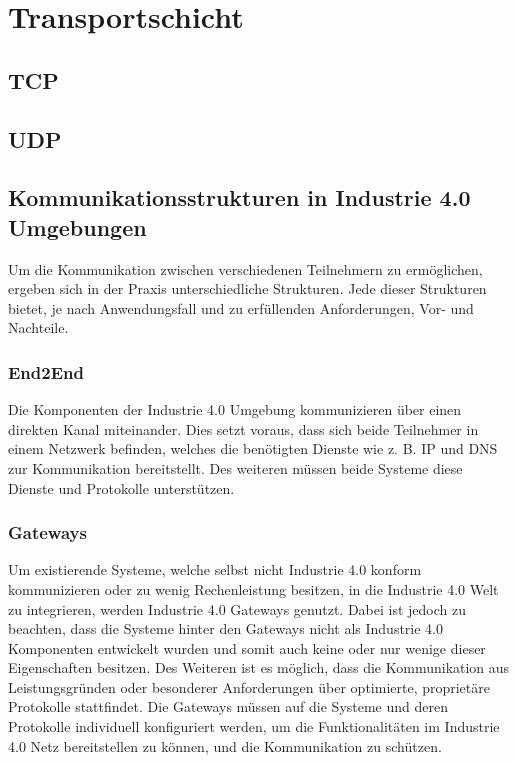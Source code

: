 \section{Transportschicht}
\subsection{TCP}
\subsection{UDP}

\subsection{Kommunikationsstrukturen in Industrie 4.0 Umgebungen}
Um die Kommunikation zwischen verschiedenen Teilnehmern zu ermöglichen, ergeben sich in der Praxis unterschiedliche Strukturen. Jede dieser Strukturen bietet, je nach Anwendungsfall und zu erfüllenden Anforderungen, Vor- und Nachteile.

\subsubsection{End2End}
Die Komponenten der Industrie 4.0 Umgebung kommunizieren über einen direkten Kanal miteinander. Dies setzt voraus, dass sich beide Teilnehmer in einem Netzwerk befinden, welches die benötigten Dienste wie z. B. \ac{IP} und \ac{DNS} zur Kommunikation bereitstellt. Des weiteren müssen beide Systeme diese Dienste und Protokolle unterstützen.

\subsubsection{Gateways}
Um existierende Systeme, welche selbst nicht Industrie 4.0 konform kommunizieren oder zu wenig Rechenleistung besitzen, in die Industrie 4.0 Welt zu integrieren, werden Industrie 4.0 Gateways genutzt. Dabei ist jedoch zu beachten, dass die Systeme hinter den Gateways nicht als Industrie 4.0 Komponenten entwickelt wurden und somit auch keine oder nur wenige dieser Eigenschaften besitzen. Des Weiteren ist es möglich, dass die Kommunikation aus Leistungsgründen oder besonderer Anforderungen über optimierte, proprietäre Protokolle stattfindet. Die Gateways müssen auf die Systeme und deren Protokolle individuell konfiguriert werden, um die Funktionalitäten im Industrie 4.0 Netz bereitstellen zu können, und die Kommunikation zu schützen.


